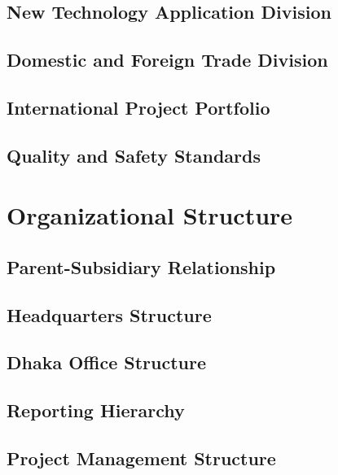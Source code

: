 \subsection{New Technology Application Division}

\subsection{Domestic and Foreign Trade Division}

\subsection{International Project Portfolio}

\subsection{Quality and Safety Standards}

\section{Organizational Structure}

\subsection{Parent-Subsidiary Relationship}

\subsection{Headquarters Structure}

\subsection{Dhaka Office Structure}

\subsection{Reporting Hierarchy}

\subsection{Project Management Structure}

